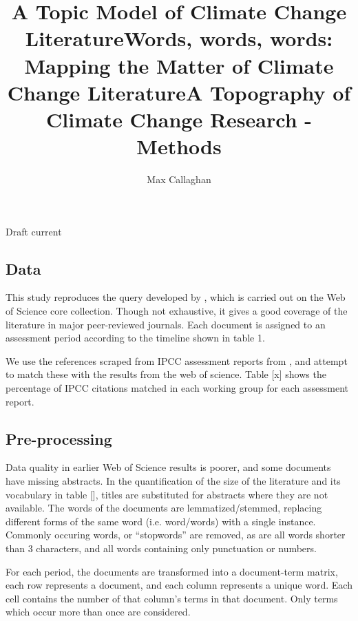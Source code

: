 \documentclass{article}
\makeatletter
\renewcommand{\maketitle}{\bgroup\setlength{\parindent}{0pt}
	\begin{flushleft}
		
		{\huge\textbf{\@title}}
		
		\bigskip
		
		{\large\textbf{\@author}}
		
		\bigskip
		
		{\large{Draft current \@date}}
		
	\end{flushleft}\egroup
}
\makeatother
\begin{document}
	\title{A Topic Model of Climate Change Literature}
	\title{Words, words, words: Mapping the Matter of Climate Change Literature}
	\title{A Topography of Climate Change Research - Methods}
	\author[1,2]{Max Callaghan}
	
	\maketitle
	\begin{linenumbers}
	
	\setcounter{figure}{0}
	\renewcommand\thefigure{SI.\arabic{figure}}  
		
	\subsection*{Data}
	
	This study reproduces the query developed by \citep{Grieneisen2011}, which is carried out on the Web of Science core collection. Though not exhaustive, it gives a good coverage of the literature in major peer-reviewed journals.	Each document is assigned to an assessment period according to the timeline shown in table 1.
	
	We use the references scraped from IPCC assessment reports from \citep{Minx2017l}, and attempt to match these with the results from the web of science. Table \todo{}[x] shows the percentage of IPCC citations matched in each working group for each assessment report.
		
	\subsection*{Pre-processing}
	
	Data quality in earlier Web of Science results is poorer, and some documents have missing abstracts. In the quantification of the size of the literature and its vocabulary in table [], titles are substituted for abstracts where they are not available.  The words of the documents are lemmatized/stemmed, replacing different forms of the same word (i.e. word/words) with a single instance. Commonly occuring words, or ``stopwords'' are removed, as are all words shorter than 3 characters, and all words containing only punctuation or numbers.
	
	For each period, the documents are transformed into a document-term matrix, each row represents a document, and each column represents a unique word.  Each cell contains the number of that column's terms in that document. Only terms which occur more than once are considered.
	

\end{linenumbers}
\end{document}

